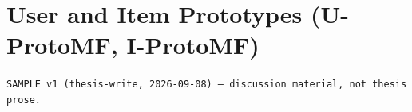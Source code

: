 \documentclass[11pt,a4paper]{article}
\begin{document}
\section*{User and Item Prototypes (U-ProtoMF, I-ProtoMF)}
{\scriptsize\color{gray}\texttt{SAMPLE v1 (thesis-write, 2026-09-08) — discussion material, not thesis prose.}\par}
\vspace{1em}


\end{document}

